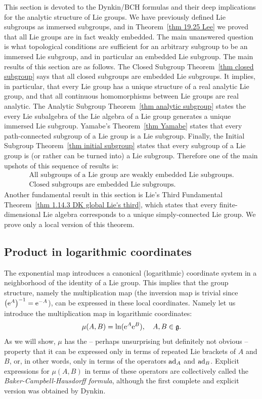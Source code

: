 This section is devoted to the Dynkin/BCH formulas and their deep implications for the analytic structure of Lie groups. We have previously defined Lie subgroups as immersed subgroups, and in Theorem~\ref{thm 19.25 Lee} we proved that all Lie groups are in fact weakly embedded. The main unanswered question is what topological conditions are sufficient for an arbitrary subgroup to be an immersed Lie subgroup, and in particular an embedded Lie subgroup. The main results of this section are as follows. The Closed Subgroup Theorem~\ref{thm closed subgroup} says that all closed subgroups are embedded Lie subgroups. It implies, in particular, that every Lie group has a unique structure of a real analytic Lie group, and that all continuous homomorphisms between Lie groups are real analytic. The Analytic Subgroup Theorem~\ref{thm analytic subgroup} states the every Lie subalgebra of the Lie algebra of a Lie group generates a unique immersed Lie subgroup. Yamabe's Theorem~\ref{thm Yamabe} states that every path-connected subgroup of a Lie group is a Lie subgroup.  Finally, the Initial Subgroup Theorem~\ref{thm initial subgroup} states that every subgroup of a Lie group is (or rather can be turned into) a Lie subgroup. Therefore one of the main upshots of this sequence of results is:
\begin{gather}
    \text{All subgroups of a Lie group are weakly embedded Lie subgroups.}\\
    \text{Closed subgroups are embedded Lie subgroups.}
\end{gather}
Another fundamental result in this section is Lie's Third Fundamental Theorem~\ref{thm 1.14.3 DK global Lie's third}, which states that every finite-dimensional Lie algebra corresponds to a unique simply-connected Lie group. We prove only a local version of this theorem.

\subsection{Product in logarithmic coordinates}\label{sec: product in log coordinates}

The exponential map introduces a canonical (logarithmic) coordinate system in a neighborhood of the identity of a Lie group. This implies that the group structure, namely the multiplication map (the inversion map is trivial since $\left(\mathrm{e}^A\right)^{-1}=\mathrm{e}^{-A}$), can be expressed in these local coordinates. Namely let us introduce the multiplication map in logarithmic coordinates:
\[\mu(A,B)=\ln(\mathrm{e}^A\mathrm{e}^B),\quad A,B\in\mathfrak{g}.\]
As we will show, $\mu$ has the -- perhaps unsurprising but definitely not obvious -- property that it can be expressed only in terms of repeated Lie brackets of $A$ and $B$, or, in other words, only in terms of the operators $\mathrm{ad}_A$ and $\mathrm{ad}_B$. Explicit expressions for $\mu(A,B)$ in terms of these operators are collectively called the \emph{Baker-Campbell-Hausdorff formula}, although the first complete and explicit version was obtained by Dynkin.

